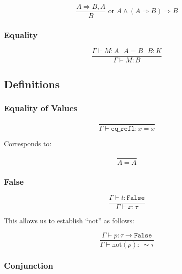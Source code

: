 \documentclass[10pt]{article}
\begin{document}
\begin{equation*}
    \frac{A \Rightarrow B, A}{B} \text{ or } A \wedge (A \Rightarrow B) \Rightarrow B
\end{equation*}

\subsubsection{Equality}

\begin{equation*}
    \frac{\Gamma \vdash M : A~~~A = B~~~B : K}{\Gamma \vdash M : B}
\end{equation*}

\subsection{Definitions}

\subsubsection{Equality of Values}

\begin{equation*}
    \frac{}{\Gamma \vdash \mathtt{eq\_refl} : x = x}
\end{equation*}

Corresponds to:

\begin{equation*}
    \frac{}{A = A}
\end{equation*}

\subsubsection{False}

\begin{equation*}
    \frac{\Gamma \vdash t : \mathtt{False}}{\Gamma \vdash x : \tau}
\end{equation*}

This allows us to establish ``not'' as follows:

\begin{equation*}
    \frac{\Gamma \vdash p : \tau \rightarrow \mathtt{False}}{\Gamma \vdash \text{not}(p) :~\sim \tau}
\end{equation*}

\subsubsection{Conjunction}
\end{document}
